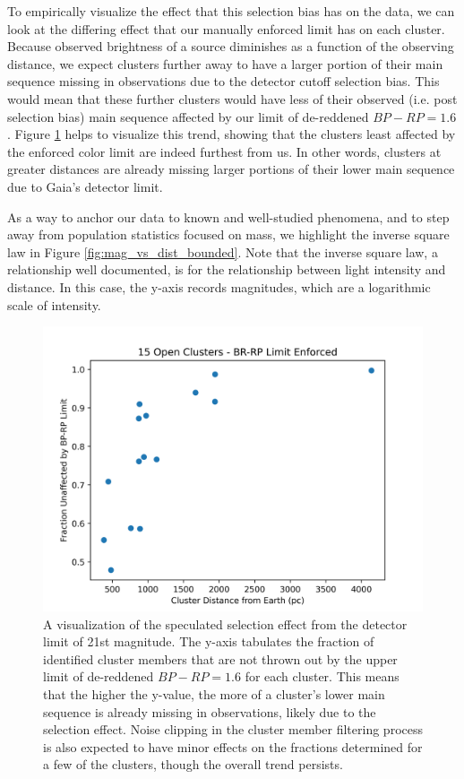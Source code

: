 \documentclass[onecolumn,table,xcdraw,super]{aastex631}
\begin{document}
To empirically visualize the effect that this selection bias has on the data, we can look at the differing effect that our manually enforced limit has on each cluster. Because observed brightness of a source diminishes as a function of the observing distance, we expect clusters further away to have a larger portion of their main sequence missing in observations due to the detector cutoff selection bias. This would mean that these further clusters would have less of their observed (i.e. post selection bias) main sequence affected by our limit of de-reddened $BP-RP = 1.6$. Figure \ref{fig:bounded_fraction_vs_dist} helps to visualize this trend, showing that the clusters least affected by the enforced color limit are indeed furthest from us. In other words, clusters at greater distances are already missing larger portions of their lower main sequence due to Gaia's detector limit.

As a way to anchor our data to known and well-studied phenomena, and to step away from population statistics focused on mass, we highlight the inverse square law in Figure \ref{fig:mag_vs_dist_bounded}. Note that the inverse square law, a relationship well documented, is for the relationship between light intensity and distance. In this case, the y-axis records magnitudes, which are a logarithmic scale of intensity. 

\begin{figure}[]
    \centering
      \includegraphics[width=4.75in]{figures/bounded_fraction_vs_dist.png}
    \caption{A visualization of the speculated selection effect from the detector limit of 21st magnitude. The y-axis tabulates the fraction of identified cluster members that are not thrown out by the upper limit of de-reddened $BP-RP = 1.6$ for each cluster. This means that the higher the y-value, the more of a cluster's lower main sequence is already missing in observations, likely due to the selection effect. Noise clipping in the cluster member filtering process is also expected to have minor effects on the fractions determined for a few of the clusters, though the overall trend persists.}
    \label{fig:bounded_fraction_vs_dist}
\end{figure}
\end{document}
